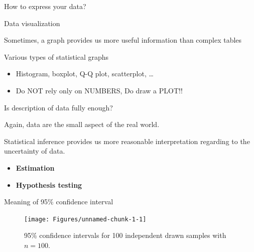 \documentclass[9pt,ignorenonframetext,xcolor=dvipsnames]{beamer}
\providecommand{\tightlist}{%
  \setlength{\itemsep}{0pt}\setlength{\parskip}{0pt}}
\newlength{\wideitemsep}
\let\olditem\item
\renewcommand{\item}{\setlength{\itemsep}{\wideitemsep}\olditem}
\begin{document}
\begin{frame}{How to express your data?}

\begin{block}{Data visualization}

\begin{mdframed}[backgroundcolor = gray!30]
Sometimes, a graph provides us more useful information than complex tables
\end{mdframed}

\end{block}

\begin{block}{Various types of statistical graphs}

\begin{itemize}
\tightlist
\item
  Histogram, boxplot, Q-Q plot, scatterplot, \ldots{}
\item
  Do NOT rely only on NUMBERS, Do draw a PLOT!!
\end{itemize}

\end{block}

\end{frame}

\begin{frame}{Is description of data fully enough?}

Again, data are the small aspect of the real world.

Statistical inference provides us more reasonable interpretation
regarding to the uncertainty of data.

\begin{tcolorbox}[colback=gray!10,colframe=black, title=\textbf{Two main category of statistical inference}]
\begin{itemize}
  \item \textbf{Estimation}
  \item \textbf{Hypothesis testing}
\end{itemize}
\end{tcolorbox}

\end{frame}

\begin{frame}{Meaning of 95\% confidence interval}

\begin{figure}[H]

{\centering \texttt{[image: Figures/unnamed-chunk-1-1]} 

}

\caption{95\% confidence intervals for 100 independent drawn samples with $n = 100$.}\label{fig:unnamed-chunk-1}
\end{figure}

\end{frame}
\end{document}
